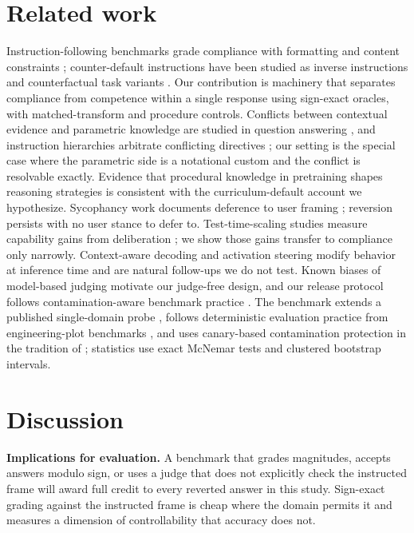 \documentclass{article}
\begin{document}
\section{Related work}\label{sec:related}
Instruction-following benchmarks grade compliance with formatting and content
constraints \citep{zhou2023ifeval}; counter-default instructions have been
studied as inverse instructions \citep{stephan2024inverse} and counterfactual
task variants \citep{wu2024reasoning}. Our contribution is machinery that
separates compliance from competence within a single response using sign-exact
oracles, with matched-transform and procedure controls. Conflicts between contextual evidence and parametric knowledge are studied in
question answering \citep{longpre2021entity,xie2024knowledgeconflict}, and
instruction hierarchies arbitrate conflicting directives
\citep{wallace2024hierarchy}; our setting is the special case where the parametric
side is a notational custom and the conflict is resolvable exactly. Evidence that
procedural knowledge in pretraining shapes reasoning strategies
\citep{ruis2025procedural} is consistent with the curriculum-default account we
hypothesize. Sycophancy work documents deference to user
framing \citep{sharma2023sycophancy}; reversion persists with no user stance to
defer to. Test-time-scaling studies measure capability gains from deliberation
\citep{muennighoff2025s1,deepseekr1}; we show those gains transfer to compliance
only narrowly. Context-aware decoding \citep{shi2024trusting} and activation steering
\citep{rimsky2024steering} modify behavior at inference time and are natural
follow-ups we do not test. Known biases of model-based judging
\citep{zheng2023judging} motivate our judge-free design, and our release protocol
follows contamination-aware benchmark practice
\citep{jacovi2023stop,srivastava2022bigbench}. The benchmark extends a
published single-domain probe \citep{ravishankara2026circuchain}, follows
deterministic evaluation practice from engineering-plot benchmarks
\citep{ravishankara2026plotchain}, and uses canary-based contamination
protection in the tradition of \citet{srivastava2022bigbench}; statistics use
exact McNemar tests \citep{mcnemar1947} and clustered bootstrap intervals.

\section{Discussion}\label{sec:discussion}
\textbf{Implications for evaluation.} A benchmark that grades magnitudes,
accepts answers modulo sign, or uses a judge that does not explicitly check the
instructed frame will award full credit to every reverted answer in this study.
Sign-exact grading against the instructed frame is cheap where the domain
permits it and measures a dimension of controllability that accuracy does not.
\end{document}
